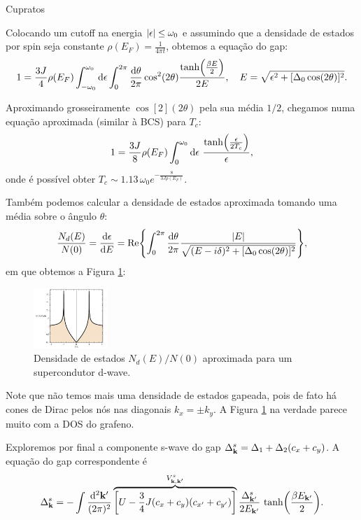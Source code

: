 \documentclass[a4paper,10pt]{article}
\begin{document}
\begin{section}{Cupratos}
\n

Colocando um cutoff na energia $\abs{\epsilon} \leq \omega_0$ e assumindo que a densidade de estados por spin seja constante $\rho(E_F) = \frac{1}{4\pi t}$, obtemos a equação do gap:
$$
1 = \frac{3 J}{4} \rho(E_F) \int_{-\omega_0}^{\omega_0} \dd{\epsilon}
\int_0^{2\pi} \frac{\dd{\theta}}{2\pi} \cos[2](2\theta) \frac{\tanh(\frac{\beta E}{2})}{2E}, \quad E = \sqrt{\epsilon^2 + [\Delta_0 \cos(2\theta)]^2}.
$$

Aproximando grosseiramente $\cos[2](2\theta)$ pela sua média $1/2$, chegamos numa equação aproximada (similar à BCS) para $T_c$:
$$
1 = \frac{3J}{8} \rho(E_F) \int_0^{\omega_0} \dd{\epsilon} \,
\frac{\tanh(\frac{\epsilon}{2T_c})}{\epsilon},
$$
onde é possível obter $T_c \sim 1.13 \, \omega_0 e^{-\frac{8}{3 J \rho(E_F)}}$.



Também podemos calcular a densidade de estados aproximada tomando uma média sobre o ângulo $\theta$:
$$
\frac{N_d(E)}{N(0)} = \dv{\epsilon}{E} =
\Re{\int_0^{2\pi} \frac{\dd{\theta}}{2\pi}
\frac{\abs{E}}{\sqrt{(E - i\delta)^2 + [\Delta_0 \cos(2\theta)]^2}}
},
$$
em que obtemos a Figura \ref{fig:dwavedos}:

\begin{figure}[H]
\centering
\includegraphics[width=0.25\textwidth]{fig/dwavedos.png}
\caption{Densidade de estados $N_d(E)/N(0)$ aproximada para um supercondutor d-wave.}
\label{fig:dwavedos}
\end{figure}

Note que não temos mais uma densidade de estados gapeada, pois de fato há cones de Dirac pelos nós nas diagonais $k_x = \pm k_y$. A Figura \ref{fig:dwavedos} na verdade parece muito com a DOS do grafeno.


Exploremos por final a componente s-wave do gap $\Delta_{\vb{k}}^s = \Delta_1 + \Delta_2 (c_x + c_y)$. A equação do gap correspondente é
$$
\Delta_{\vb{k}}^s = - \int \frac{\dd[2]{\vb{k}'}}{(2\pi)^2}
\overbrace{\qty[U - \frac{3}{4} J (c_x + c_y)(c_{x'}+ c_{y'})]}^{V_{\vb{k},\vb{k}'}^s}
\frac{\Delta_{\vb{k}'}^s}{2 E_{\vb{k}'}} \, \tanh(\frac{\beta E_{\vb{k}'}}{2}).
$$


\end{section}
\end{document}
